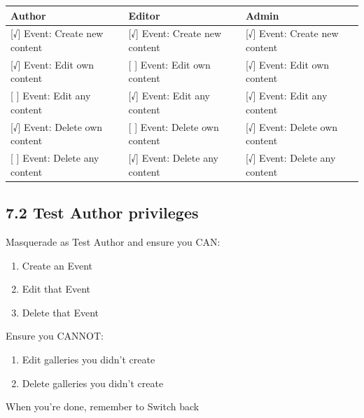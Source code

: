 \documentclass[letterpaper,10pt,english]{sphinxmanual}
\begin{document}
\begin{tabulary}{\linewidth}{|L|L|L|}
\hline
\textbf{
Author
} & \textbf{
Editor
} & \textbf{
Admin
}\\\hline

{[}√{]} Event: Create new content
 & 
{[}√{]} Event: Create new content
 & 
{[}√{]} Event: Create new content
\\\hline

{[}√{]}  Event: Edit own content
 & 
{[} {]} Event: Edit own content
 & 
{[}√{]} Event: Edit own content
\\\hline

{[} {]}  Event: Edit any content
 & 
{[}√{]} Event: Edit any content
 & 
{[}√{]} Event: Edit any content
\\\hline

{[}√{]}  Event: Delete own content
 & 
{[} {]} Event: Delete own content
 & 
{[}√{]} Event: Delete own content
\\\hline

{[} {]}  Event: Delete any content
 & 
{[}√{]}  Event: Delete any content
 & 
{[}√{]} Event: Delete any content
\\\hline
\end{tabulary}



\subsection{7.2 Test Author privileges}
\label{event_calendar:test-author-privileges}
Masquerade as Test Author and ensure you CAN:
\begin{enumerate}
\item {} 
Create an Event

\item {} 
Edit that Event

\item {} 
Delete that Event

\end{enumerate}

Ensure you CANNOT:
\begin{enumerate}
\item {} 
Edit galleries you didn’t create

\item {} 
Delete galleries you didn’t create

\end{enumerate}

When you’re done, remember to Switch back
\end{document}
